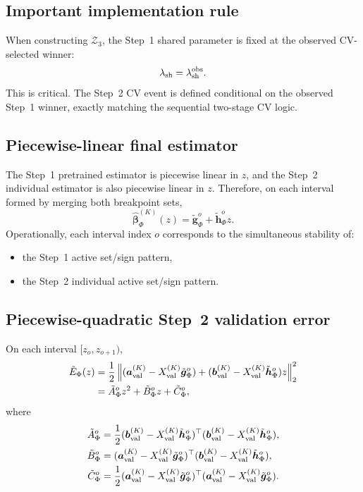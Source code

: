 \documentclass[11pt]{article}
\begin{document}
\subsection{Important implementation rule}
When constructing $\mathcal{Z}_3$, the Step~1 shared parameter is fixed at the observed CV-selected winner:
\[
\lambda_{\rm sh} = \lambda_{\rm sh}^{\rm obs}.
\]
This is critical. The Step~2 CV event is defined conditional on the observed Step~1 winner, exactly matching the sequential two-stage CV logic.

\subsection{Piecewise-linear final estimator}
The Step~1 pretrained estimator is piecewise linear in $z$, and the Step~2 individual estimator is also piecewise linear in $z$. Therefore, on each interval formed by merging both breakpoint sets,
\[
\hat{\bm\beta}_{\Phi}^{(K)}(z) = \tilde{\bm g}_{\Phi}^{o} + \tilde{\bm h}_{\Phi}^{o} z.
\]
Operationally, each interval index $o$ corresponds to the simultaneous stability of:
\begin{itemize}[leftmargin=2em]
    \item the Step~1 active set/sign pattern,
    \item the Step~2 individual active set/sign pattern.
\end{itemize}

\subsection{Piecewise-quadratic Step~2 validation error}
On each interval $[z_o, z_{o+1})$,
\begin{align*}
\tilde{E}_{\Phi}(z)
&=
\frac{1}{2}
\left\|
(\bm{a}^{(K)}_{\rm val} - X^{(K)}_{\rm val}\tilde{\bm g}_{\Phi}^{o})
+
(\bm{b}^{(K)}_{\rm val} - X^{(K)}_{\rm val}\tilde{\bm h}_{\Phi}^{o})z
\right\|_2^2
\\
&=
\tilde{A}_{\Phi}^{o} z^2 + \tilde{B}_{\Phi}^{o} z + \tilde{C}_{\Phi}^{o},
\end{align*}
where
\begin{align*}
\tilde{A}_{\Phi}^{o}
&=
\frac{1}{2}
(\bm{b}^{(K)}_{\rm val} - X^{(K)}_{\rm val}\tilde{\bm h}_{\Phi}^{o})^{\top}
(\bm{b}^{(K)}_{\rm val} - X^{(K)}_{\rm val}\tilde{\bm h}_{\Phi}^{o}),
\\
\tilde{B}_{\Phi}^{o}
&=
(\bm{a}^{(K)}_{\rm val} - X^{(K)}_{\rm val}\tilde{\bm g}_{\Phi}^{o})^{\top}
(\bm{b}^{(K)}_{\rm val} - X^{(K)}_{\rm val}\tilde{\bm h}_{\Phi}^{o}),
\\
\tilde{C}_{\Phi}^{o}
&=
\frac{1}{2}
(\bm{a}^{(K)}_{\rm val} - X^{(K)}_{\rm val}\tilde{\bm g}_{\Phi}^{o})^{\top}
(\bm{a}^{(K)}_{\rm val} - X^{(K)}_{\rm val}\tilde{\bm g}_{\Phi}^{o}).
\end{align*}
\end{document}
